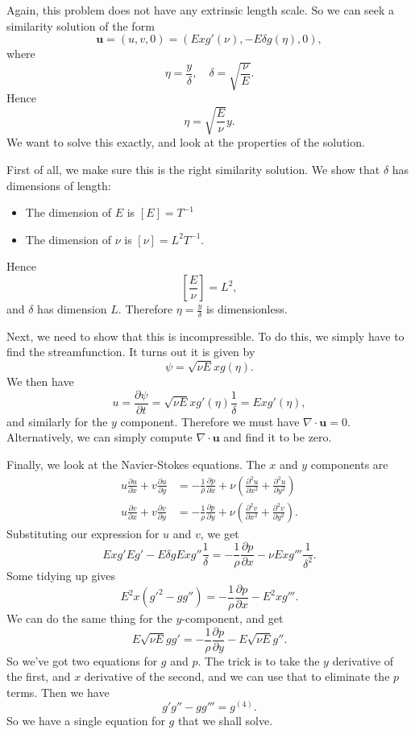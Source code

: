 \documentclass[a4paper]{article}
\begin{document}
Again, this problem does not have any extrinsic length scale. So we can seek a similarity solution of the form
\[
  \mathbf{u} = (u, v, 0) = (Ex g'(\nu), -E \delta g(\eta), 0),
\]
where
\[
  \eta = \frac{y}{\delta}, \quad \delta = \sqrt{\frac{\nu}{E}}.
\]
Hence
\[
  \eta = \sqrt{\frac{E}{\nu}} y.
\]
We want to solve this exactly, and look at the properties of the solution.

First of all, we make sure this is the right similarity solution. We show that $\delta$ has dimensions of length:
\begin{itemize}
  \item The dimension of $E$ is $[E] = T^{-1}$
  \item The dimension of $\nu$ is $[\nu] = L^2 T^{-1}$.
\end{itemize}
Hence
\[
  \left[\frac{E}{\nu}\right] = L^2,
\]
and $\delta$ has dimension $L$. Therefore $\eta = \frac{y}{\delta}$ is dimensionless.

Next, we need to show that this is incompressible. To do this, we simply have to find the streamfunction. It turns out it is given by
\[
  \psi = \sqrt{\nu E} x g(\eta).
\]
We then have
\[
  u = \frac{\partial \psi}{\partial t} = \sqrt{\nu E} x g'(\eta) \frac{1}{\delta} = Ex g'(\eta),
\]
and similarly for the $y$ component. Therefore we must have $\nabla \cdot \mathbf{u} = 0$. Alternatively, we can simply compute $\nabla \cdot \mathbf{u}$ and find it to be zero.

Finally, we look at the Navier-Stokes equations. The $x$ and $y$ components are
\begin{align*}
  u \frac{\partial u}{\partial x} + v \frac{\partial u}{\partial y} &= -\frac{1}{\rho}\frac{\partial p}{\partial x} + \nu \left(\frac{\partial^2 u}{\partial x^2} + \frac{\partial^2 u}{\partial y^2}\right)\\
  u \frac{\partial v}{\partial x} + v \frac{\partial v}{\partial y} &= -\frac{1}{\rho}\frac{\partial p}{\partial y} + \nu \left(\frac{\partial^2 v}{\partial x^2} + \frac{\partial^2 v}{\partial y^2}\right).
\end{align*}
Substituting our expression for $u$ and $v$, we get
\[
  Ex g'E g' - E \delta g E x g'' \frac{1}{\delta} = -\frac{1}{\rho} \frac{\partial p}{\partial x} - \nu E xg''' \frac{1}{\delta^2}.
\]
Some tidying up gives
\[
  E^2 x(g'^2 - gg'') = -\frac{1}{\rho} \frac{\partial p}{\partial x} - E^2 x g'''.
\]
We can do the same thing for the $y$-component, and get
\[
  E\sqrt{\nu E}gg' = -\frac{1}{\rho} \frac{\partial p}{\partial y} - E\sqrt{\nu E}g''.
\]
So we've got two equations for $g$ and $p$. The trick is to take the $y$ derivative of the first, and $x$ derivative of the second, and we can use that to eliminate the $p$ terms. Then we have
\[
  g'g'' - gg''' = g^{(4)}.
\]
So we have a single equation for $g$ that we shall solve.
\end{document}
